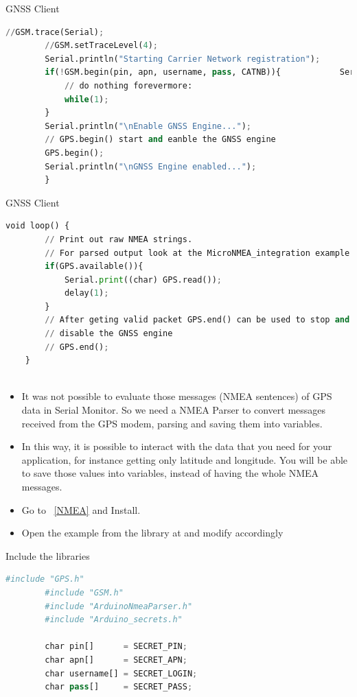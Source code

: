 \begin{frame}[fragile]{GNSS Client}
	
	\begin{lstlisting}[language=Python]
		//GSM.trace(Serial);
		//GSM.setTraceLevel(4);
		Serial.println("Starting Carrier Network registration");
		if(!GSM.begin(pin, apn, username, pass, CATNB)){			Serial.println("The board was not able to register to the network...");
			// do nothing forevermore:
			while(1);
		}
		Serial.println("\nEnable GNSS Engine...");
		// GPS.begin() start and eanble the GNSS engine
		GPS.begin();
		Serial.println("\nGNSS Engine enabled...");	
		}
		\end{lstlisting}
\end{frame}

\begin{frame}[fragile]{GNSS Client}
	
	\begin{lstlisting}[language=Python]
	void loop() {
		// Print out raw NMEA strings.
		// For parsed output look at the MicroNMEA_integration example.
		if(GPS.available()){
			Serial.print((char) GPS.read());
			delay(1);
		}
		// After geting valid packet GPS.end() can be used to stop and
		// disable the GNSS engine
		// GPS.end();
	}
		
	\end{lstlisting}
\end{frame}

{
	\begin{itemize}
	\item It was not possible to evaluate those messages (NMEA sentences) of GPS data in Serial Monitor. So we need a NMEA Parser to convert messages received from the GPS modem, parsing and saving them into variables.
	\item In this way, it is possible to interact with the data that you need for your application, for instance getting only latitude and longitude. You will be able to save those values into variables, instead of having the whole NMEA messages.
	\item Go to  ~\ref{NMEA} and Install.
	\item Open the example from the library at  and modify accordingly
	\end{itemize}
}


\begin{frame}[fragile]{Include the libraries}
	
	\begin{lstlisting}[language=Python]
		#include "GPS.h"
		#include "GSM.h"
		#include "ArduinoNmeaParser.h"
		#include "Arduino_secrets.h"
		
		char pin[]      = SECRET_PIN;
		char apn[]      = SECRET_APN;
		char username[] = SECRET_LOGIN;
		char pass[]     = SECRET_PASS;
	\end{lstlisting}
\end{frame}

